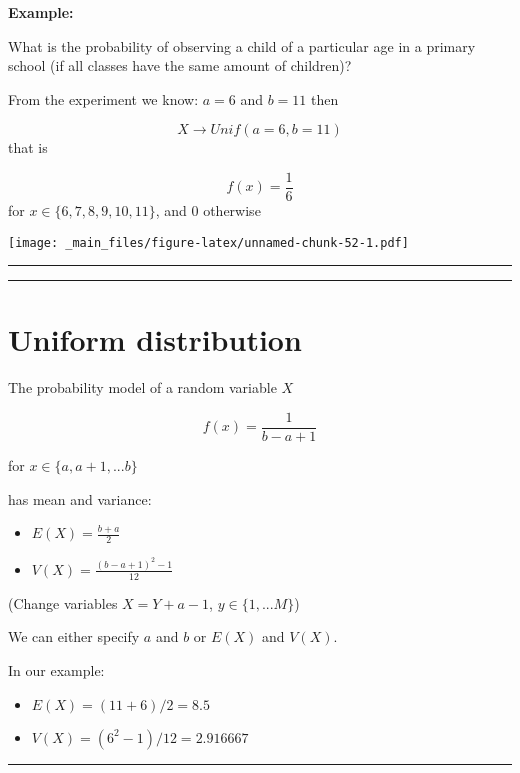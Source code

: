 \documentclass[
]{book}
\providecommand{\tightlist}{%
  \setlength{\itemsep}{0pt}\setlength{\parskip}{0pt}}
\begin{document}
\textbf{Example:}

What is the probability of observing a child of a particular age in a primary school (if all classes have the same amount of children)?

From the experiment we know: \(a=6\) and \(b=11\) then

\[X \rightarrow Unif(a=6, b=11)\] that is

\[f(x)=\frac{1}{6}\] for \(x\in \{6,7,8,9,10,11\}\), and \(0\) otherwise

\texttt{[image: \_main\_files/figure-latex/unnamed-chunk-52-1.pdf]}

\begin{center}\rule{0.5\linewidth}{0.5pt}\end{center}

\begin{center}\rule{0.5\linewidth}{0.5pt}\end{center}

\hypertarget{uniform-distribution-1}{%
\section{Uniform distribution}\label{uniform-distribution-1}}

The probability model of a random variable \(X\)

\[f(x)=\frac{1}{b-a+1}\]

for \(x \in \{a, a+1, ...b\}\)

has mean and variance:

\begin{itemize}
\item
  \(E(X)= \frac{b+a}{2}\)
\item
  \(V(X)= \frac{(b-a+1)^2-1}{12}\)
\end{itemize}

(Change variables \(X=Y+a-1\), \(y \in \{1,...M\}\))

We can either specify \(a\) and \(b\) or \(E(X)\) and \(V(X)\).

In our example:

\begin{itemize}
\tightlist
\item
  \(E(X)=(11+6)/2=8.5\)
\item
  \(V(X)=(6^2-1)/12=2.916667\)
\end{itemize}

\begin{center}\rule{0.5\linewidth}{0.5pt}\end{center}
\end{document}
